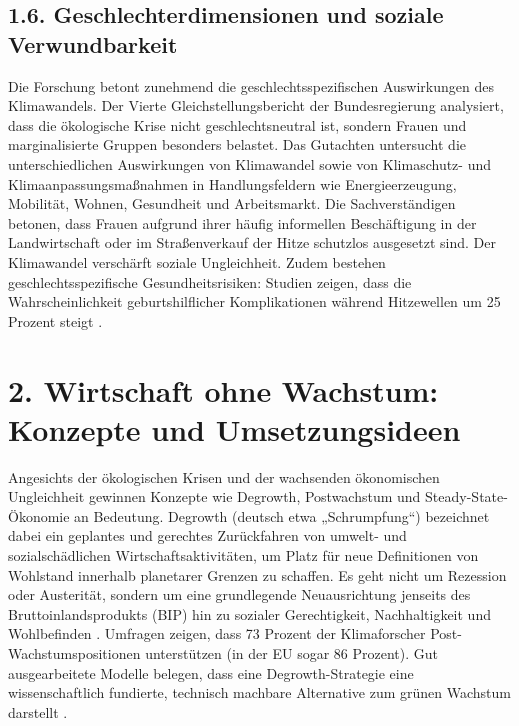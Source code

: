 \documentclass[12pt, a4paper]{article}
\begin{document}
	\subsection*{1.6. Geschlechterdimensionen und soziale Verwundbarkeit}
	Die Forschung betont zunehmend die geschlechtsspezifischen Auswirkungen des
	Klimawandels.
	Der Vierte Gleichstellungsbericht der Bundesregierung analysiert, dass
	die ökologische Krise nicht geschlechtsneutral ist, sondern Frauen und marginalisierte
	Gruppen besonders belastet.
	Das Gutachten untersucht die unterschiedlichen Auswirkungen
	von Klimawandel sowie von Klimaschutz- und Klimaanpassungsmaßnahmen in Handlungsfeldern
	wie Energieerzeugung, Mobilität, Wohnen, Gesundheit und Arbeitsmarkt.
	Die
	Sachverständigen betonen, dass Frauen aufgrund ihrer häufig informellen Beschäftigung
	in der Landwirtschaft oder im Straßenverkauf der Hitze schutzlos ausgesetzt sind.
	Der Klimawandel verschärft soziale Ungleichheit. Zudem bestehen geschlechtsspezifische
	Gesundheitsrisiken: Studien zeigen, dass die Wahrscheinlichkeit geburtshilflicher
	Komplikationen während Hitzewellen um 25 Prozent steigt \cite{gleichstellungsbericht2025}.
	
	\section*{2. Wirtschaft ohne Wachstum: Konzepte und Umsetzungsideen}
	
	Angesichts der ökologischen Krisen und der wachsenden ökonomischen Ungleichheit
	gewinnen Konzepte wie Degrowth, Postwachstum und Steady-State-Ökonomie an Bedeutung.
	Degrowth (deutsch etwa „Schrumpfung“) bezeichnet dabei ein geplantes und gerechtes
	Zurückfahren von umwelt- und sozialschädlichen Wirtschaftsaktivitäten, um Platz für
	neue Definitionen von Wohlstand innerhalb planetarer Grenzen zu schaffen.
	Es geht
	nicht um Rezession oder Austerität, sondern um eine grundlegende Neuausrichtung
	jenseits des Bruttoinlandsprodukts (BIP) hin zu sozialer Gerechtigkeit, Nachhaltigkeit
	und Wohlbefinden \cite{lse2025}.
	Umfragen zeigen, dass 73 Prozent der Klimaforscher
	Post-Wachstumspositionen unterstützen (in der EU sogar 86 Prozent).
	Gut ausgearbeitete
	Modelle belegen, dass eine Degrowth-Strategie eine wissenschaftlich fundierte,
	technisch machbare Alternative zum grünen Wachstum darstellt \cite{greenpeace2025b}.
	
\end{document}
